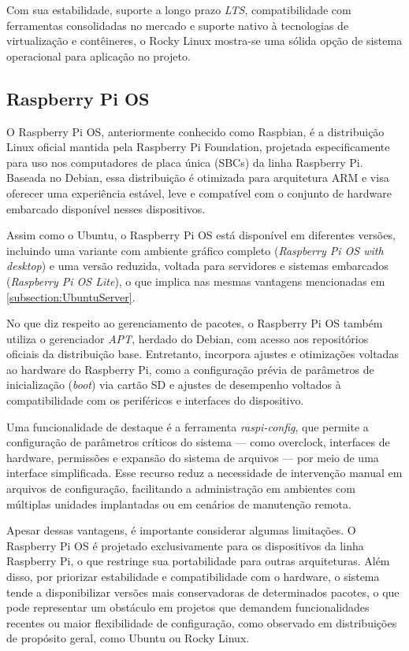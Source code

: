 Com sua estabilidade, suporte a longo prazo \textit{LTS}, compatibilidade com ferramentas consolidadas no mercado e suporte nativo à tecnologias de virtualização e contêineres, o Rocky Linux mostra-se uma sólida opção de sistema operacional para aplicação no projeto.

\subsection{Raspberry Pi OS}
\label{subsection:RaspberryPiOS}

O Raspberry Pi OS, anteriormente conhecido como Raspbian, é a distribuição Linux oficial mantida pela Raspberry Pi Foundation, projetada especificamente para uso nos computadores de placa única (SBCs) da linha Raspberry Pi. Baseada no Debian, essa distribuição é otimizada para arquitetura ARM e visa oferecer uma experiência estável, leve e compatível com o conjunto de hardware embarcado disponível nesses dispositivos.

Assim como o Ubuntu, o Raspberry Pi OS está disponível em diferentes versões, incluindo uma variante com ambiente gráfico completo (\textit{Raspberry Pi OS with desktop}) e uma versão reduzida, voltada para servidores e sistemas embarcados (\textit{Raspberry Pi OS Lite}), o que implica nas mesmas vantagens mencionadas em \ref{subsection:UbuntuServer}.

No que diz respeito ao gerenciamento de pacotes, o Raspberry Pi OS também utiliza o gerenciador \textit{APT}, herdado do Debian, com acesso aos repositórios oficiais da distribuição base. Entretanto, incorpora ajustes e otimizações voltadas ao hardware do Raspberry Pi, como a configuração prévia de parâmetros de inicialização (\textit{boot}) via cartão SD e ajustes de desempenho voltados à compatibilidade com os periféricos e interfaces do dispositivo.

Uma funcionalidade de destaque é a ferramenta \textit{raspi-config}, que permite a configuração de parâmetros críticos do sistema — como overclock, interfaces de hardware, permissões e expansão do sistema de arquivos — por meio de uma interface simplificada. Esse recurso reduz a necessidade de intervenção manual em arquivos de configuração, facilitando a administração em ambientes com múltiplas unidades implantadas ou em cenários de manutenção remota.

Apesar dessas vantagens, é importante considerar algumas limitações. O Raspberry Pi OS é projetado exclusivamente para os dispositivos da linha Raspberry Pi, o que restringe sua portabilidade para outras arquiteturas. Além disso, por priorizar estabilidade e compatibilidade com o hardware, o sistema tende a disponibilizar versões mais conservadoras de determinados pacotes, o que pode representar um obstáculo em projetos que demandem funcionalidades recentes ou maior flexibilidade de configuração, como observado em distribuições de propósito geral, como Ubuntu ou Rocky Linux.

